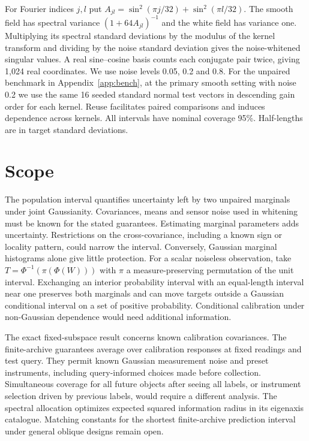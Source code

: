 \documentclass[11pt]{article}
\begin{document}
For Fourier indices $j,l$ put $A_{jl}=\sin^2(\pi j/32)+\sin^2(\pi l/32)$. The smooth field has spectral variance $(1+64A_{jl})^{-1}$ and the white field has variance one. Multiplying its spectral standard deviations by the modulus of the kernel transform and dividing by the noise standard deviation gives the noise-whitened singular values. A real sine--cosine basis counts each conjugate pair twice, giving 1,024 real coordinates. We use noise levels 0.05, 0.2 and 0.8. For the unpaired benchmark in Appendix~\ref{app:bench}, at the primary smooth setting with noise 0.2 we use the same 16 seeded standard normal test vectors in descending gain order for each kernel. Reuse facilitates paired comparisons and induces dependence across kernels. All intervals have nominal coverage 95\%. Half-lengths are in target standard deviations.



\section{Scope}
The population interval quantifies uncertainty left by two unpaired marginals under joint Gaussianity. Covariances, means and sensor noise used in whitening must be known for the stated guarantees. Estimating marginal parameters adds uncertainty. Restrictions on the cross-covariance, including a known sign or locality pattern, could narrow the interval. Conversely, Gaussian marginal histograms alone give little protection. For a scalar noiseless observation, take $T=\Phi^{-1}(\pi(\Phi(W)))$ with $\pi$ a measure-preserving permutation of the unit interval. Exchanging an interior probability interval with an equal-length interval near one preserves both marginals and can move targets outside a Gaussian conditional interval on a set of positive probability. Conditional calibration under non-Gaussian dependence would need additional information.

The exact fixed-subspace result concerns known calibration covariances. The finite-archive guarantees average over calibration responses at fixed readings and test query. They permit known Gaussian measurement noise and preset instruments, including query-informed choices made before collection. Simultaneous coverage for all future objects after seeing all labels, or instrument selection driven by previous labels, would require a different analysis. The spectral allocation optimizes expected squared information radius in its eigenaxis catalogue. Matching constants for the shortest finite-archive prediction interval under general oblique designs remain open.
\end{document}
